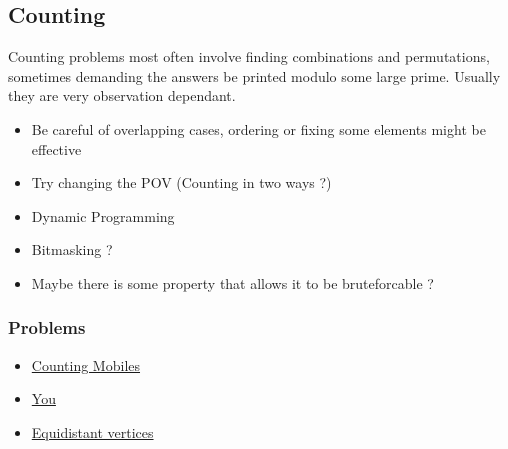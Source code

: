 \subsection*{Counting}
Counting problems most often involve finding combinations and permutations, sometimes demanding the answers be printed modulo some large prime. Usually they are very observation dependant. 

\begin{itemize}
	\item Be careful of overlapping cases, ordering or fixing some elements might be effective
	\item Try changing the POV (Counting in two ways ?)
	\item Dynamic Programming
	\item Bitmasking ?
	\item Maybe there is some property that allows it to be bruteforcable ?
\end{itemize}
\subsubsection*{Problems}
\begin{itemize}
	\item \href{https://vjudge.net/problem/CodeChef-MOBCNT}{Counting Mobiles}
	\item \href{https://codeforces.com/contest/1554/problem/E}{You}
	\item \href{https://codeforces.com/contest/1551/problem/F}{Equidistant vertices}
\end{itemize}	